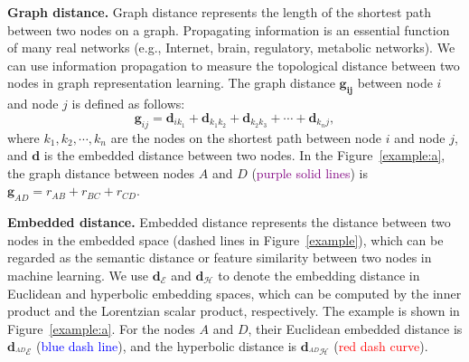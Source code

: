 \textbf{Graph distance. }
Graph distance represents the length of the shortest path between two nodes on a graph.
Propagating information is an essential function of many real networks (e.g., Internet, brain, regulatory, metabolic networks). 
We can use information propagation to measure the topological distance between two nodes in graph representation learning. 
The graph distance $\mathbf{g_{i j}}$ between node $i$ and node $j$ is defined as follows: 
\begin{equation}\label{graphdist}
    \mathbf{g}_{i j} = \mathbf{d}_{i k_1} + \mathbf{d}_{k_1 k_2} + \mathbf{d}_{k_2 k_3} + \cdots + \mathbf{d}_{k_n j},
\end{equation}
where $k_1,k_2,\cdots,k_n$ are the nodes on the shortest path between node $i$ and node $j$, and $\mathbf{d}$ is the embedded distance between two nodes. 
In the Figure~\ref{example:a}, the graph distance between nodes $A$ and $D$ (\textcolor{purple}{purple solid lines}) is $\mathbf{g}_{AD}=r_{AB}+r_{BC}+r_{CD}$. 

\textbf{Embedded distance. }
Embedded distance represents the distance between two nodes in the embedded space (dashed lines in Figure~\ref{example}), which can be regarded as the semantic distance or feature similarity between two nodes in machine learning. 
We use $\mathbf{d}_{\mathcal{E}}$ and $\mathbf{d}_{\mathcal{H}}$ to denote the embedding distance in Euclidean and hyperbolic embedding spaces, which can be computed by the inner product and the Lorentzian scalar product, respectively. 
The example is shown in Figure~\ref{example:a}. 
For the nodes $A$ and $D$, their Euclidean embedded distance is $\mathbf{d}_{^{AD}\mathcal{E}}$ (\textcolor{blue}{blue dash line}), and the hyperbolic distance is $\mathbf{d}_{^{AD}\mathcal{H}}$ (\textcolor{red}{red dash curve}). 

